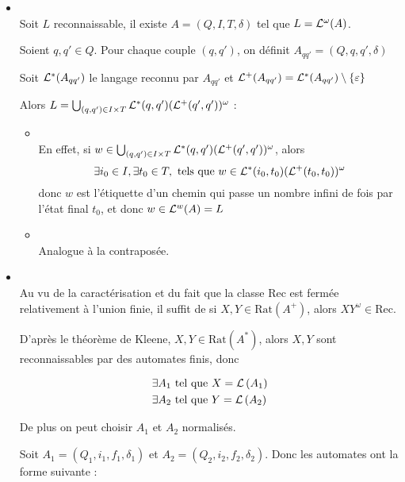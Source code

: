 \begin{proofI}
	\begin{itemize}
		\item \bimpRL \\
		      Soit $L$ reconnaissable, il existe $A = (Q,I,T,\delta)$ tel que $L = \mathcal{L}^{\omega}(A)$.

		      Soient $q,q' \in Q$. Pour chaque couple $(q,q')$, on définit $A_{qq'} = (Q,q,q',\delta)$

		      Soit $\mathcal{L}^*(A_{qq'})$ le langage reconnu par $A_{qq'}$ et $\mathcal{L}^+(A_{qq'}) = \mathcal{L}^*(A_{qq'}) \setminus \left\{\varepsilon\right\}$

		      Alors $L = \bigcup_{(q,q') \in I \times T} \mathcal{L}^*(q,q')(\mathcal{L}^+(q',q'))^{\omega}$ :

		      \begin{itemize}
			      \item \fbox{$\supseteq$} \\
			            En effet, si $w \in \bigcup_{(q,q') \in I \times T} \mathcal{L}^*(q,q')(\mathcal{L}^+(q',q'))^{\omega}$, alors
			            $$\exists i_0 \in I, \exists t_0 \in T, \text{ tels que } w \in \mathcal{L}^*(i_0,t_0)(\mathcal{L}^+(t_0,t_0))^{\omega}$$
			            donc $w$ est l'étiquette d'un chemin qui passe un nombre infini de fois par l'état final $t_0$, et donc
			            $w\in \mathcal{L}^w (A) = L$
			      \item \fbox{$\subseteq$} \\
			            Analogue à la contraposée.
		      \end{itemize}

		\item \bimpLR \\
		      Au vu de la caractérisation et du fait que la classe Rec est fermée relativement à l'union finie, il suffit de \mq si
		      $X,Y \in \text{Rat}(A^+)$, alors $XY^{\omega} \in \text{Rec}$.

		      D'après le théorème de Kleene, $X,Y \in \text{Rat} (A^*)$, alors $X,Y$ sont reconnaissables par des automates finis, donc

		      \begin{eqnarray*}
			      &\exists A_1 \text{ tel que } X = \mathcal{L}\left(A_1\right) \\
			      &\exists A_2 \text{ tel que } Y = \mathcal{L}\left(A_2\right)
		      \end{eqnarray*}

		      De plus on peut choisir $A_1$ et $A_2$ normalisés.

		      Soit $A_1 = (Q_1, i_1, f_1, \delta_1)$ et $A_2 = (Q_2, i_2, f_2, \delta_2)$.
		      Donc les automates ont la forme suivante :


\end{itemize}
\end{proofI}
